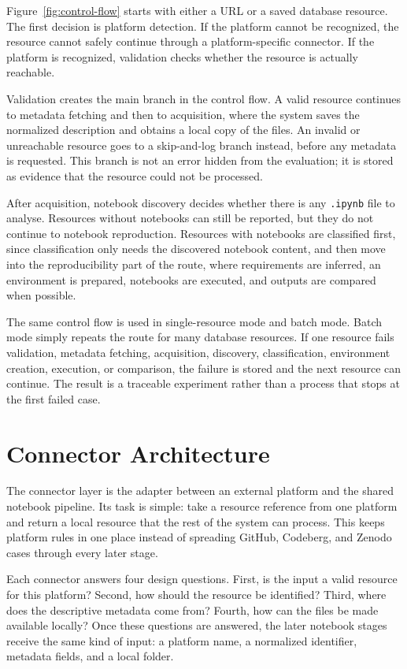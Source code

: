 Figure~\ref{fig:control-flow} starts with either a URL or a saved database resource. The first decision is platform detection. If the platform cannot be recognized, the resource cannot safely continue through a platform-specific connector. If the platform is recognized, validation checks whether the resource is actually reachable.

Validation creates the main branch in the control flow. A valid resource continues to metadata fetching and then to acquisition, where the system saves the normalized description and obtains a local copy of the files. An invalid or unreachable resource goes to a skip-and-log branch instead, before any metadata is requested. This branch is not an error hidden from the evaluation; it is stored as evidence that the resource could not be processed.

After acquisition, notebook discovery decides whether there is any \texttt{.ipynb} file to analyse. Resources without notebooks can still be reported, but they do not continue to notebook reproduction. Resources with notebooks are classified first, since classification only needs the discovered notebook content, and then move into the reproducibility part of the route, where requirements are inferred, an environment is prepared, notebooks are executed, and outputs are compared when possible.

The same control flow is used in single-resource mode and batch mode. Batch mode simply repeats the route for many database resources. If one resource fails validation, metadata fetching, acquisition, discovery, classification, environment creation, execution, or comparison, the failure is stored and the next resource can continue. The result is a traceable experiment rather than a process that stops at the first failed case.

\section{Connector Architecture}
\label{sec:connector-design}

The connector layer is the adapter between an external platform and the shared notebook pipeline. Its task is simple: take a resource reference from one platform and return a local resource that the rest of the system can process. This keeps platform rules in one place instead of spreading GitHub, Codeberg, and Zenodo cases through every later stage.

Each connector answers four design questions. First, is the input a valid resource for this platform? Second, how should the resource be identified? Third, where does the descriptive metadata come from? Fourth, how can the files be made available locally? Once these questions are answered, the later notebook stages receive the same kind of input: a platform name, a normalized identifier, metadata fields, and a local folder.

